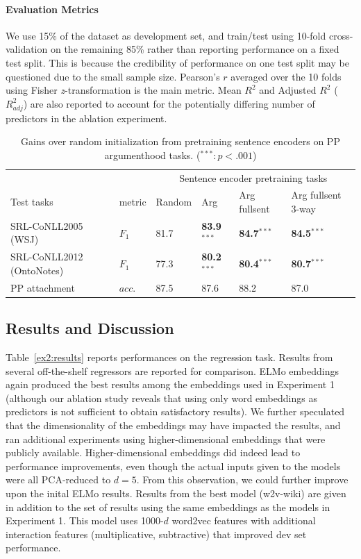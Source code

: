 \documentclass[letterpaper]{article} %
\begin{document}
\paragraph{Evaluation Metrics}
We use 15\% of the dataset as development set, and train/test using 10-fold cross-validation on the remaining 85\% rather than reporting performance on a fixed test split. This is because the credibility of performance on one test split may be questioned due to the small sample size. Pearson's $r$ averaged over the 10 folds using Fisher \textit{z}-transformation is the main metric. Mean $R^2$ and Adjusted $R^2$ ($R^2_{adj}$) are also reported to account for the potentially differing number of predictors in the ablation experiment.

\begin{table}[h]
    \centering
	\begin{tabular}{@{}l|l|llll@{}}
		\toprule
		& & \multicolumn{4}{c}{Sentence encoder pretraining tasks} \\ 
		Test tasks & metric & Random & Arg & Arg fullsent & Arg fullsent 3-way \\ \midrule
		SRL-CoNLL2005 (WSJ)  & $F_1$ &  81.7 & \textbf{83.9$^{***}$} & \textbf{84.7$^{***}$} & \textbf{84.5$^{***}$}  \\
		SRL-CoNLL2012 (OntoNotes) & $F_1$  & 77.3 & \textbf{80.2$^{***}$} & \textbf{80.4$^{***}$} & \textbf{80.7$^{***}$} \\
	    PP attachment \cite{belinkov2014exploring} & $acc.$ & 87.5 & 87.6 & 88.2 & 87.0 \\	     
		\bottomrule
	\end{tabular}
\caption{\normalsize Gains over random initialization from pretraining sentence encoders on PP argumenthood tasks. ($^{***}: p<.001$)}
\label{exp:pretrain}
\end{table}

\subsection{Results and Discussion}

Table~\ref{ex2:results} reports performances on the regression task. Results from several off-the-shelf regressors are reported for comparison. ELMo embeddings again produced the best results among the embeddings used in Experiment 1 (although our ablation study reveals that using only word embeddings as predictors is not sufficient to obtain satisfactory results). We further speculated that the dimensionality of the embeddings may have impacted the results, and ran additional experiments using higher-dimensional embeddings that were publicly available. Higher-dimensional embeddings did indeed lead to performance improvements, even though the actual inputs given to the models were all PCA-reduced to $d=5$. From this observation, we could further improve upon the inital ELMo results. Results from the best model (w2v-wiki) are given in addition to the set of results using the same embeddings as the models in Experiment 1. This model uses 1000-$d$ word2vec features with additional interaction features (multiplicative, subtractive) that improved dev set performance. 
\end{document}
